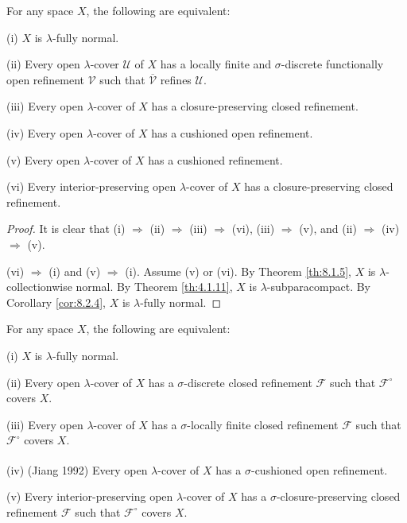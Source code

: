 \documentclass[jiang8iv.tex]{subfiles}
\begin{document}
{\theorem{\label{th:8.2.7}} 
For any space $X$, the following are equivalent:

\textup{(i)} \(X\) is \(\lambda\)-fully normal.

\textup{(ii)}  Every open \(\lambda\)-cover \(\mathscr{U}\) of \(X\) has a locally finite
 and $\sigma$-discrete functionally open refinement \(\mathscr{V}\) such that \(\mathscr{\overline{V}}\) refines \(\mathscr{U}\).

\textup{(iii)}  Every open \(\lambda\)-cover of \(X\) has a closure-preserving 
closed refinement.

\textup{(iv)}  Every open \(\lambda\)-cover of \(X\) has a cushioned open refinement.

\textup{(v)} Every open \(\lambda\)-cover of $X$ has a cushioned refinement.

\textup{(vi)} Every interior-preserving open \(\lambda\)-cover of $X$
has a closure-preserving closed refinement.
}

\begin{proof} It is clear that (i) \(\Rightarrow\) (ii) \(\Rightarrow\) (iii) \(\Rightarrow\) (vi),
 (iii) \(\Rightarrow\) (v), and (ii) \(\Rightarrow\) (iv) \(\Rightarrow\) (v). 
 
(vi) \(\Rightarrow\) (i) and (v) \(\Rightarrow\) (i).
Assume (v) or (vi). By Theorem \ref{th:8.1.5}, \(X\) is \(\lambda\)-collectionwise
normal. By Theorem \ref{th:4.1.11}, \(X\) is \(\lambda\)-subparacompact. 
By Corollary \ref{cor:8.2.4}, \(X\) is \(\lambda\)-fully normal. 
\end{proof}

{\theorem{\label{th:8.2.8}}
For any space $X$, the following are equivalent:

\textup{(i)}   \(X\) is \(\lambda\)-fully normal.

\textup{(ii)}   Every open \(\lambda\)-cover of $X$  has a \(\sigma\)-discrete closed 
refinement \(\mathscr{F}\) such that \(\mathscr{F}^\circ\) covers \(X\).


\textup{(iii)}   Every open \(\lambda\)-cover  of $X$ has a \(\sigma\)-locally finite 
closed refinement \(\mathscr{F}\) such that \(\mathscr{F}^\circ\) covers \(X\).

\textup{(iv)}  \textup{(\hstretch{1.8}{[}Jiang 1992\hstretch{1.8}{]}\textsuperscript{\cite{Jiang1992}})}
Every open \(\lambda\)-cover of $X$  has a \(\sigma\)-cushioned open refinement.

\textup{(v)}  Every interior-preserving open \(\lambda\)-cover  of $X$ has a
 \(\sigma\)-closure-preserving closed refinement \(\mathscr{F}\) 
 such that \(\mathscr{F}^\circ\) covers \(X\).
}
\end{document}
